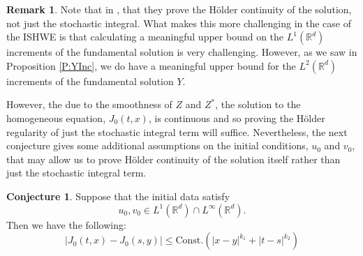 \documentclass[a4paper,11pt]{article}
\numberwithin{equation}{section}
\theoremstyle{plain}
\theoremstyle{definition}
\newtheorem{remark}[theorem]{Remark}
\newtheorem{conjecture}[theorem]{Conjecture}
\newcommand{\R}{\mathbb{R}}
\numberwithin{NQ}{section}
\numberwithin{LQ}{section}
\numberwithin{ZQ}{section}
\begin{document}
\begin{remark}
  Note that in \cite{millet.sanz-sole:21:global}, that they prove the H\"older continuity of the
  solution, not just the stochastic integral. What makes this more challenging in the case of the
  ISHWE is that calculating a meaningful upper bound on the $L^1(\R^d)$ increments of the
  fundamental solution is very challenging. However, as we saw in Proposition \ref{P:YInc}, we do
  have a meaningful upper bound for the $L^2(\R^d)$ increments of the fundamental solution $Y$.

  However, the due to the smoothness of $Z$ and $Z^*$, the solution to the homogeneous equation,
  $J_0(t,x)$, is continuous and so proving the H\"older regularity of just the stochastic integral
  term will suffice. Nevertheless, the next conjecture gives some additional assumptions on the
  initial conditions, $u_0$ and $v_0$, that may allow us to prove H\"older continuity of the
  solution itself rather than just the stochastic integral term.
\end{remark}

\begin{conjecture}
	Suppose that the initial data satisfy
  \[
    u_0, v_0 \in L^1(\R^d) \cap L^{\infty}(\R^d).
  \]
  Then we have the following:
	\begin{equation}
		\left| J_0(t,x) - J_0(s,y) \right| \le \text{Const.}\left(|x-y|^{k_1} + |t-s|^{k_2}\right)
	\end{equation}
\end{conjecture}
\end{document}
